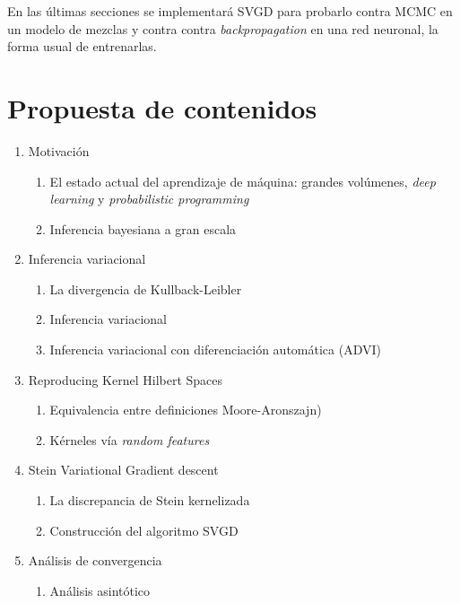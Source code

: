 \documentclass[11pt]{article}
\begin{document}
En las últimas secciones se implementará SVGD para probarlo contra MCMC en un
modelo de mezclas y contra contra \textit{backpropagation} en una red neuronal,
la forma usual de entrenarlas.
\section{Propuesta de contenidos}
\begin{enumerate}
	\item Motivación
	\begin{enumerate}[label=1.\arabic*]
\item El estado actual del aprendizaje de máquina:  grandes volúmenes,
\textit{deep learning} y \textit{probabilistic programming}
		\item Inferencia bayesiana a gran escala
	\end{enumerate}
	\item Inferencia variacional
	\begin{enumerate}[label=2.\arabic*]
		\item La divergencia de Kullback-Leibler
		\item Inferencia variacional \cite{vi}
\item Inferencia variacional con diferenciación automática (ADVI)
\cite{Kucukelbir2016}
	\end{enumerate}
	\item Reproducing Kernel Hilbert Spaces \cite{Berlinet2009}
	\begin{enumerate}[label=3.\arabic*]
\item Equivalencia entre definiciones %
Moore-Aronszajn)
		\item Kérneles vía \textit{random features} \cite{Rahimi}
	\end{enumerate}
	\item Stein Variational Gradient descent
	\begin{enumerate}[label=4.\arabic*]
\item La discrepancia de Stein kernelizada \cite{kernelized-stein-discrepancy,
measuring-quality}
		\item Construcción del algoritmo SVGD \cite{svgd}
	\end{enumerate}
	\item Análisis de convergencia 
	\begin{enumerate}[label=5.\arabic*]
		\item Análisis asintótico \cite{svgd-gradient-flow, Trillos2017}
		\begin{enumerate}[label=5.1.\arabic*]

\end{enumerate}
\end{enumerate}
\end{enumerate}
\end{document}
